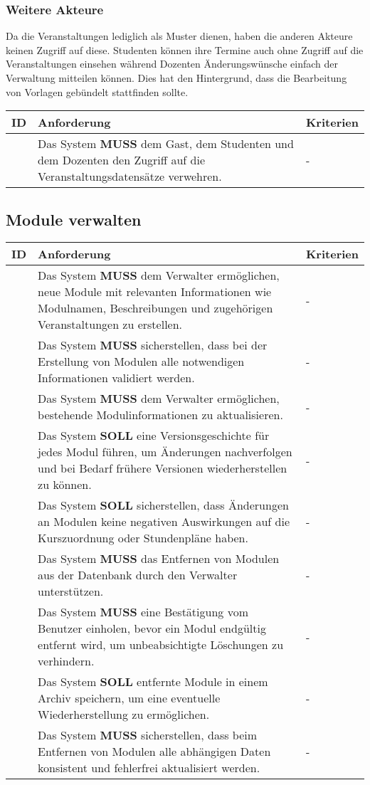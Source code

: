 \subsubsection{Weitere Akteure}
Da die Veranstaltungen lediglich als Muster dienen, haben die anderen Akteure keinen Zugriff auf diese. Studenten können ihre Termine auch ohne Zugriff auf die Veranstaltungen einsehen während Dozenten Änderungswünsche einfach der Verwaltung mitteilen können. Dies hat den Hintergrund, dass die Bearbeitung von Vorlagen gebündelt stattfinden sollte.
\begin{tabular} {|p{}|p{}|p{}|}
	\hline
	ID & Anforderung & Kriterien \\
	\hline
	\printfreqnr
	& Das System \textbf{MUSS} dem Gast, dem Studenten und dem Dozenten den Zugriff auf die Veranstaltungsdatensätze verwehren.
	& - \\
	\hline
\end{tabular}

\newpage
\subsection{Module verwalten}
\begin{tabular} {|p{}|p{}|p{}|}
	\hline
	ID & Anforderung & Kriterien \\
	\hline
	\printfreqnr
	& Das System \textbf{MUSS} dem Verwalter ermöglichen, neue Module mit relevanten Informationen wie Modulnamen, Beschreibungen und zugehörigen Veranstaltungen zu erstellen. 
	& - \\
	\hline
	\printfreqnr
	& Das System \textbf{MUSS} sicherstellen, dass bei der Erstellung von Modulen alle notwendigen Informationen validiert werden. 
	& - \\
	\hline
	\printfreqnr
	& Das System \textbf{MUSS} dem Verwalter ermöglichen, bestehende Modulinformationen zu aktualisieren. 
	& - \\
	\hline
	\printfreqnr
	& Das System \textbf{SOLL} eine Versionsgeschichte für jedes Modul führen, um Änderungen nachverfolgen und bei Bedarf frühere Versionen wiederherstellen zu können. 
	& - \\
	\hline
	\printfreqnr
	& Das System \textbf{SOLL} sicherstellen, dass Änderungen an Modulen keine negativen Auswirkungen auf die Kurszuordnung oder Stundenpläne haben. 
	& - \\
	\hline
	\printfreqnr
	& Das System \textbf{MUSS} das Entfernen von Modulen aus der Datenbank durch den Verwalter unterstützen. 
	& - \\
	\hline
	\printfreqnr
	& Das System \textbf{MUSS} eine Bestätigung vom Benutzer einholen, bevor ein Modul endgültig entfernt wird, um unbeabsichtigte Löschungen zu verhindern. 
	& - \\
	\hline
	\printfreqnr
	& Das System \textbf{SOLL} entfernte Module in einem Archiv speichern, um eine eventuelle Wiederherstellung zu ermöglichen. 
	& - \\
	\hline
	\printfreqnr
	& Das System \textbf{MUSS} sicherstellen, dass beim Entfernen von Modulen alle abhängigen Daten konsistent und fehlerfrei aktualisiert werden. 
	& - \\
	\hline
\end{tabular}

